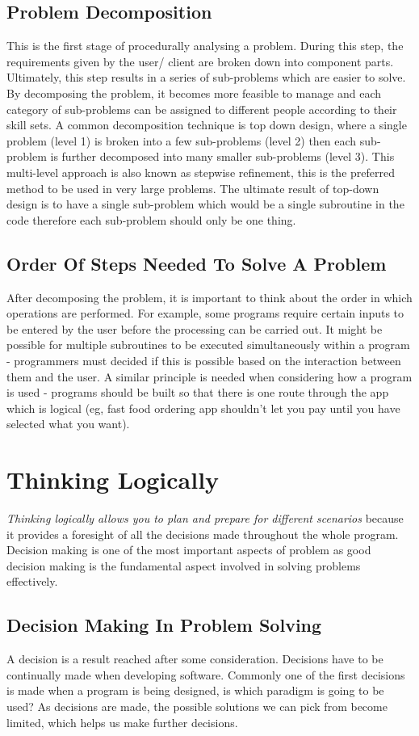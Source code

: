 \documentclass[a4paper,11pt, twocolumn]{article}
\begin{document}
\subsection{Problem Decomposition}
This is the first stage of procedurally analysing a problem. During this step, the requirements given by the user/ client are broken down into component parts. Ultimately, this step results in a series of sub-problems which are easier to solve. By decomposing the problem, it becomes more feasible to manage and each category of sub-problems can be assigned to different people according to their skill sets. A common decomposition technique is top down design, where a single problem (level 1) is broken into a few sub-problems (level 2) then each sub-problem is further decomposed into many smaller sub-problems (level 3). This multi-level approach is also known as stepwise refinement, this is the preferred method to be used in very large problems. The ultimate result of top-down design is to have a single sub-problem which would be a single subroutine in the code therefore each sub-problem should only be one thing. 
\subsection{Order Of Steps Needed To Solve A Problem}
After decomposing the problem, it is important to think about the order in which operations are performed. For example, some programs require certain inputs to be entered by the user before the processing can be carried out. It might be possible for multiple subroutines to be executed simultaneously within a program - programmers must decided if this is possible based on the interaction between them and the user. A similar principle is needed when considering how a program is used - programs should be built so that there is one route through the app which is logical (eg, fast food ordering app shouldn't let you pay until you have selected what you want).

\section{Thinking Logically}
\textit{Thinking logically allows you to plan and prepare for different scenarios} because it provides a foresight of all the decisions made throughout the whole program. Decision making is one of the most important aspects of problem as good decision making is the fundamental aspect involved in solving problems effectively.
\subsection{Decision Making In Problem Solving}
A decision is a result reached after some consideration. Decisions have to be continually made when developing software. Commonly one of the first decisions is made when a program is being designed, is which paradigm is going to be used? As decisions are made, the possible solutions we can pick from become limited, which helps us make further decisions. 
\end{document}
